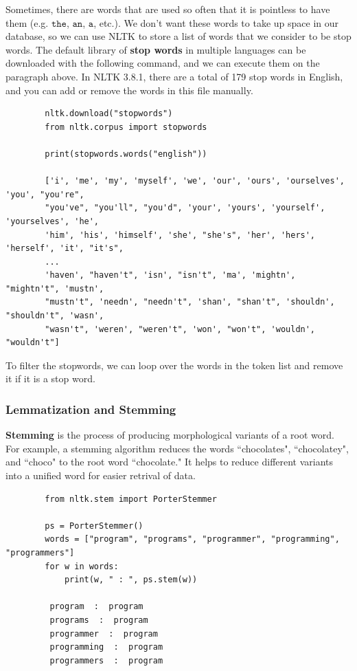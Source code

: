 \documentclass{article}
\begin{document}
      Sometimes, there are words that are used so often that it is pointless to have them (e.g. $\texttt{the}$, $\texttt{an}$, $\texttt{a}$, etc.). We don't want these words to take up space in our database, so we can use NLTK to store a list of words that we consider to be stop words. The default library of \textbf{stop words} in multiple languages can be downloaded with the following command, and we can execute them on the paragraph above. In NLTK 3.8.1, there are a total of 179 stop words in English, and you can add or remove the words in this file manually. 

      \begin{lstlisting}
        nltk.download("stopwords") 
        from nltk.corpus import stopwords 

        print(stopwords.words("english"))

        ['i', 'me', 'my', 'myself', 'we', 'our', 'ours', 'ourselves', 'you', "you're", 
        "you've", "you'll", "you'd", 'your', 'yours', 'yourself', 'yourselves', 'he', 
        'him', 'his', 'himself', 'she', "she's", 'her', 'hers', 'herself', 'it', "it's", 
        ...
        'haven', "haven't", 'isn', "isn't", 'ma', 'mightn', "mightn't", 'mustn', 
        "mustn't", 'needn', "needn't", 'shan', "shan't", 'shouldn', "shouldn't", 'wasn', 
        "wasn't", 'weren', "weren't", 'won', "won't", 'wouldn', "wouldn't"]
      \end{lstlisting}

      To filter the stopwords, we can loop over the words in the token list and remove it if it is a stop word. 

    \subsubsection{Lemmatization and Stemming}

      \textbf{Stemming} is the process of producing morphological variants of a root word. For example, a stemming algorithm reduces the words ``chocolates", ``chocolatey", and ``choco" to the root word ``chocolate." It helps to reduce different variants into a unified word for easier retrival of data. 

      \begin{lstlisting}
        from nltk.stem import PorterStemmer 

        ps = PorterStemmer() 
        words = ["program", "programs", "programmer", "programming", "programmers"]
        for w in words:
            print(w, " : ", ps.stem(w))

         program  :  program
         programs  :  program
         programmer  :  program
         programming  :  program
         programmers  :  program
      \end{lstlisting}
\end{document}
